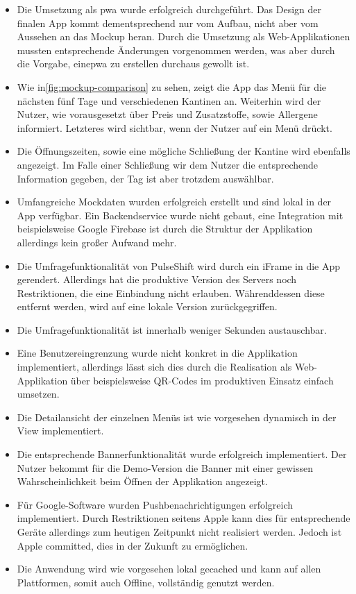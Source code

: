 \begin{itemize}
\item Die Umsetzung als \gls{pwa} wurde erfolgreich durchgeführt. Das Design der finalen App kommt dementsprechend nur vom Aufbau, nicht aber vom Aussehen an das Mockup heran. Durch die Umsetzung als Web-Applikationen mussten entsprechende Änderungen vorgenommen werden, was aber durch die Vorgabe, eine\gls{pwa} zu erstellen durchaus gewollt ist.
\item Wie in\vref{fig:mockup-comparison} zu sehen, zeigt die App das Menü für die nächsten fünf Tage und verschiedenen Kantinen an. Weiterhin wird der Nutzer, wie vorausgesetzt über Preis und Zusatzstoffe, sowie Allergene informiert. Letzteres wird sichtbar, wenn der Nutzer auf ein Menü drückt.
\item Die Öffnungszeiten, sowie eine mögliche Schließung der Kantine wird ebenfalls angezeigt. Im Falle einer Schließung wir dem Nutzer die entsprechende Information gegeben, der Tag ist aber trotzdem auswählbar.
\item Umfangreiche Mockdaten wurden erfolgreich erstellt und sind lokal in der App verfügbar. Ein Backendservice wurde nicht gebaut, eine Integration mit beispielsweise Google Firebase ist durch die Struktur der Applikation allerdings kein großer Aufwand mehr.
\item Die Umfragefunktionalität von PulseShift wird durch ein iFrame in die App gerendert. Allerdings hat die produktive Version des Servers noch Restriktionen, die eine Einbindung nicht erlauben. Währenddessen diese entfernt werden, wird auf eine lokale Version zurückgegriffen.
\item Die Umfragefunktionalität ist innerhalb weniger Sekunden austauschbar.
\item Eine Benutzereingrenzung wurde nicht konkret in die Applikation implementiert, allerdings lässt sich dies durch die Realisation als Web-Applikation über beispielsweise QR-Codes im produktiven Einsatz einfach umsetzen.
\item Die Detailansicht der einzelnen Menüs ist wie vorgesehen dynamisch in der View implementiert.
\item Die entsprechende Bannerfunktionalität wurde erfolgreich implementiert. Der Nutzer bekommt für die Demo-Version die Banner mit einer gewissen Wahrscheinlichkeit beim Öffnen der Applikation angezeigt.
\item Für Google-Software wurden Pushbenachrichtigungen erfolgreich implementiert. Durch Restriktionen seitens Apple kann dies für entsprechende Geräte allerdings zum heutigen Zeitpunkt nicht realisiert werden. Jedoch ist Apple committed, dies in der Zukunft zu ermöglichen.
\item Die Anwendung wird wie vorgesehen lokal gecached und kann auf allen Plattformen, somit auch Offline, vollständig genutzt werden.
\end{itemize}